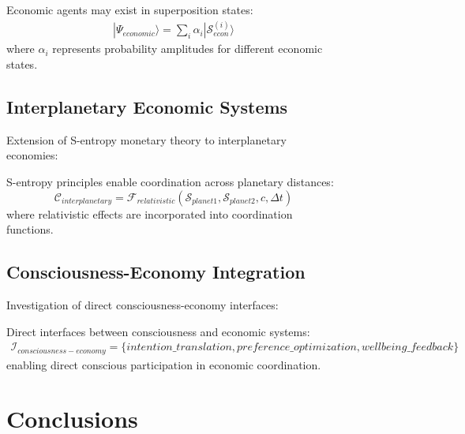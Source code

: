 \begin{figure}[h]
    \begin{definition}
    Economic agents may exist in superposition states:
    \begin{align}
    |\Psi_{economic}\rangle = \sum_{i} \alpha_i |\mathcal{S}_{econ}^{(i)}\rangle
    \end{align}
    where $\alpha_i$ represents probability amplitudes for different economic states.
    \end{definition}
    
    \subsection{Interplanetary Economic Systems}
    
    Extension of S-entropy monetary theory to interplanetary economies:
    
    \begin{theorem}
    S-entropy principles enable coordination across planetary distances:
    \begin{equation}
    \mathcal{C}_{interplanetary} = \mathcal{F}_{relativistic}(\mathcal{S}_{planet1}, \mathcal{S}_{planet2}, c, \Delta t)
    \end{equation}
    where relativistic effects are incorporated into coordination functions.
    \end{theorem}
    
    \subsection{Consciousness-Economy Integration}
    
    Investigation of direct consciousness-economy interfaces:
    
    \begin{definition}
    Direct interfaces between consciousness and economic systems:
    \begin{align}
    \mathcal{I}_{consciousness-economy} = \{intention\_translation, preference\_optimization, wellbeing\_feedback\}
    \end{align}
    enabling direct conscious participation in economic coordination.
    \end{definition}
    
    \section{Conclusions}
    

\end{figure}

